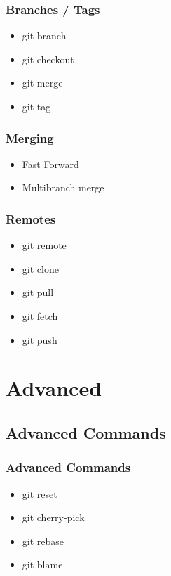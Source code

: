 \documentclass{beamer}
\begin{document}
			\begin{frame}
				\frametitle{Branches / Tags}

				\begin{itemize}
					\item{git branch}
					\item{git checkout}
					\item{git merge}
					\item{git tag}
				\end{itemize}
			\end{frame}

			\begin{frame}
				\frametitle{Merging}

				\begin{itemize}
					\item{Fast Forward}
					\item{Multibranch merge}
				\end{itemize}
			\end{frame}

			\begin{frame}
				\frametitle{Remotes}

				\begin{itemize}
					\item{git remote}
					\item{git clone}
					\item{git pull}
					\item{git fetch}
					\item{git push}
				\end{itemize}
			\end{frame}

	\section{Advanced}

		\subsection{Advanced Commands}

			\begin{frame}
				\frametitle{Advanced Commands}

				\begin{itemize}
					\item{git reset}
					\item{git cherry-pick}
					\item{git rebase}
					\item{git blame}
				\end{itemize}
			\end{frame}
\end{document}
